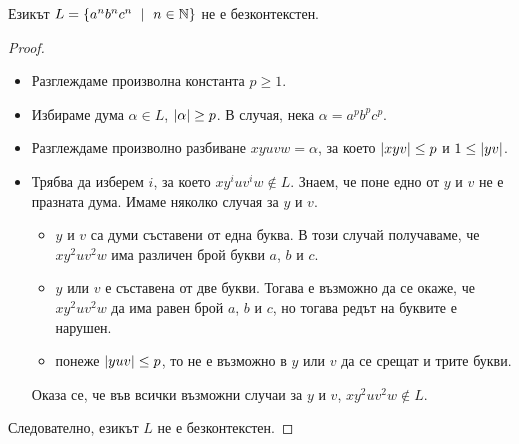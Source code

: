 \begin{example}
  \label{example:anbncn}
  Езикът $L = \{a^nb^nc^n\ \mid\ n\in\mathbb{N}\}$ не е безконтекстен.
\end{example}
\begin{proof}
  \begin{itemize}
  \item 
    Разглеждаме произволна константа $p \geq 1$.
  \item
    Избираме дума $\alpha \in L$, $\lvert{\alpha}\rvert \geq p$.
    В случая, нека $\alpha = a^pb^pc^p$.
  \item
    Разглеждаме произволно разбиване $xyuvw = \alpha$, за което $\lvert{xyv}\rvert \leq p$ и $1 \leq \lvert{yv}\rvert$.
  \item
    Трябва да изберем $i$, за което $xy^iuv^iw \not\in L$.
    Знаем, че поне едно от $y$ и $v$ не е празната дума.
    Имаме няколко случая за $y$ и $v$.
    \begin{itemize}
    \item
      $y$ и $v$ са думи съставени от една буква.
      В този случай получаваме, че $xy^2uv^2w$ има различен брой букви $a$, $b$ и $c$.
    \item
      $y$ или $v$ е съставена от две букви.
      Тогава е възможно да се окаже, че $xy^2uv^2w$ да има равен брой $a$, $b$ и $c$,
      но тогава редът на буквите е нарушен.
    \item
      понеже $\lvert{yuv}\rvert \leq p$, то не е възможно в $y$ или $v$ да се срещат и трите букви.
    \end{itemize}  
    Оказа се, че във всички възможни случаи за $y$ и $v$, 
    $xy^2uv^2w \not\in L$.
  \end{itemize}
  Следователно, езикът $L$ не е безконтекстен.
\end{proof}


